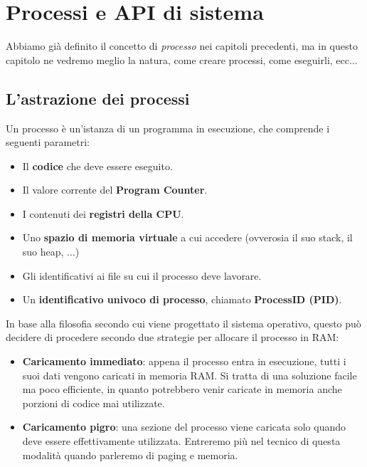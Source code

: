 \documentclass[12pt]{report}
\begin{document}
	\chapter{Processi e API di sistema}
	Abbiamo già definito il concetto di \textit{processo} nei capitoli precedenti, ma in questo capitolo ne vedremo meglio la natura, come creare processi, come eseguirli, ecc...
	
	\section{L'astrazione dei processi}
	Un processo è un'istanza di un programma in esecuzione, che comprende i seguenti parametri:
	\begin{itemize}
		\item Il \textbf{codice} che deve essere eseguito.
		
		\item Il valore corrente del \textbf{Program Counter}.
		
		\item I contenuti dei \textbf{registri della CPU}.
		
		\item Uno \textbf{spazio di memoria virtuale} a cui accedere (ovverosia il suo stack, il suo heap, ...)
		
		\item Gli identificativi ai file su cui il processo deve lavorare.
		
		\item Un \textbf{identificativo univoco di processo}, chiamato \textbf{ProcessID (PID)}.
	\end{itemize}
	
	In base alla filosofia secondo cui viene progettato il sistema operativo, questo può decidere di procedere secondo due strategie per allocare il processo in RAM:
	\begin{itemize}
		\item \textbf{Caricamento immediato}: appena il processo entra in esecuzione, tutti i suoi dati vengono caricati in memoria RAM. Si tratta di una soluzione facile ma poco efficiente, in quanto potrebbero venir caricate in memoria anche porzioni di codice mai utilizzate.
		
		\item \textbf{Caricamento pigro}: una sezione del processo viene caricata solo quando deve essere effettivamente utilizzata. Entreremo più nel tecnico di questa modalità quando parleremo di paging e memoria.
	\end{itemize}
	
\end{document}
